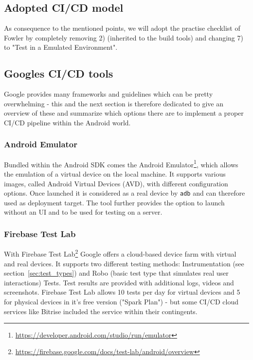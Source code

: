\subsection{Adopted CI/CD model}
As consequence to the mentioned points, we will adopt the practise checklist of Fowler by completely removing 2) (inherited to the build tools) and changing 7) to "Test in a Emulated Environment".

\subsection{Googles CI/CD tools}

Google provides many frameworks and guidelines which can be pretty overwhelming - this and the next section is therefore dedicated to give an overview of these and summarize which options there are to implement a proper CI/CD pipeline within the Android world. 

\subsubsection{Android Emulator}

Bundled within the Android SDK comes the Android Emulator\footnote{\url{https://developer.android.com/studio/run/emulator}}, which allows the emulation of a virtual device on the local machine. It supports various images, called Android Virtual Devices (AVD), with different configuration options. Once launched it is considered as a real device by \texttt{adb} and can therefore used as deployment target. The tool further provides the option to launch without an UI and to be used for testing on a server.

\subsubsection{Firebase Test Lab}
With Firebase Test Lab\footnote{\url{https://firebase.google.com/docs/test-lab/android/overview}} Google offers a cloud-based device farm with virtual and real devices. It supports two different testing methods: Instrumentation (see section~\ref{sec:test_types}) and Robo (basic test type that simulates real user interactions) Tests. Test results are provided with additional logs, videos and screenshots.
Firebase Test Lab allows 10 tests per day for virtual devices and 5 for physical devices in it's free version ("Spark Plan") - but some CI/CD cloud services like Bitrise included the service within their contingents.

